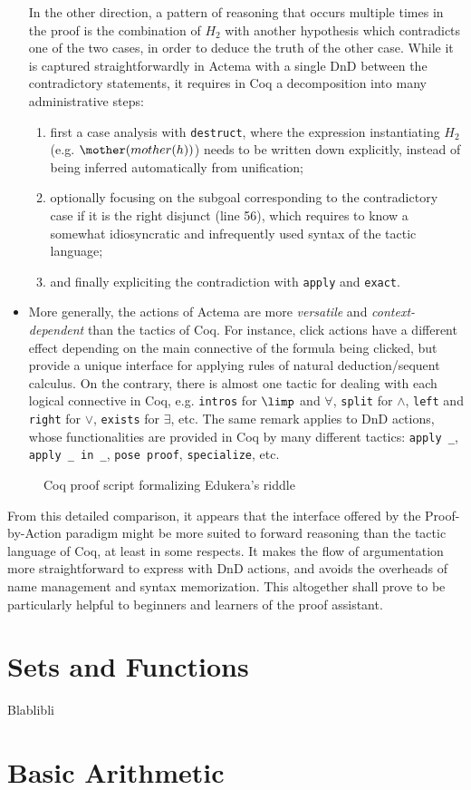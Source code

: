\begin{itemize}
  In the other direction, a pattern of reasoning that occurs multiple times in
  the proof is the combination of $H_2$ with another hypothesis which
  contradicts one of the two cases, in order to deduce the truth of the other
  case. While it is captured straightforwardly in Actema with a single DnD
  between the contradictory statements, it requires in Coq a decomposition into
  many administrative steps:
  \begin{enumerate}
    \item first a case analysis with \texttt{destruct}, where the expression
    instantiating $H_2$ (e.g. $\mother(mother(h))$) needs to be written down
    explicitly, instead of being inferred automatically from unification;
    \item optionally focusing on the subgoal corresponding to the contradictory
    case if it is the right disjunct (line 56), which requires to know a
    somewhat idiosyncratic and infrequently used syntax of the tactic language;
    \item and finally expliciting the contradiction with \texttt{apply} and
    \texttt{exact}.
  \end{enumerate}

  \item More generally, the actions of Actema are more \emph{versatile} and
  \emph{context-dependent} than the tactics of Coq. For instance, click actions
  have a different effect depending on the main connective of the formula being
  clicked, but provide a unique interface for applying rules of natural
  deduction/sequent calculus. On the contrary, there is almost one tactic for
  dealing with each logical connective in Coq, e.g. \texttt{intros} for $\limp$
  and $\forall$, \texttt{split} for $\land$, \texttt{left} and \texttt{right}
  for $\lor$, \texttt{exists} for $\exists$, etc. The same remark applies to DnD
  actions, whose functionalities are provided in Coq by many different tactics:
  \texttt{apply \_}, \texttt{apply \_ in \_}, \texttt{pose proof},
  \texttt{specialize}, etc.
\end{itemize}

\begin{figure}[p]
  
  \caption{Coq proof script formalizing Edukera's riddle}
\end{figure}

From this detailed comparison, it appears that the interface offered by the
Proof-by-Action paradigm might be more suited to forward reasoning than the
tactic language of Coq, at least in some respects. It makes the flow of
argumentation more straightforward to express with DnD actions, and avoids the
overheads of name management and syntax memorization. This altogether shall
prove to be particularly helpful to beginners and learners of the proof
assistant.


\section{Sets and Functions}

Blablibli


\section{Basic Arithmetic}
